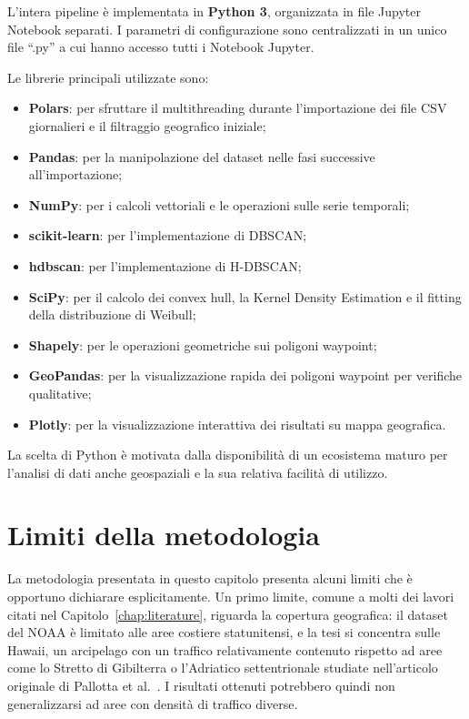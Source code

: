 L'intera pipeline è implementata in \textbf{Python 3}, organizzata in file Jupyter Notebook separati. 
I parametri di configurazione sono centralizzati in un unico file ``.py'' a cui hanno accesso tutti i Notebook Jupyter.

Le librerie principali utilizzate sono:

\begin{itemize}
    \item \textbf{Polars}: per sfruttare il multithreading durante l'importazione dei file CSV giornalieri e il filtraggio geografico iniziale;
    \item \textbf{Pandas}: per la manipolazione del dataset nelle fasi successive all'importazione;
    \item \textbf{NumPy}: per i calcoli vettoriali e le operazioni sulle serie temporali;
    \item \textbf{scikit-learn}: per l'implementazione di DBSCAN\@;
    \item \textbf{hdbscan}: per l'implementazione di H-DBSCAN;
    \item \textbf{SciPy}: per il calcolo dei convex hull, la Kernel Density Estimation e il fitting della distribuzione di Weibull;
    \item \textbf{Shapely}: per le operazioni geometriche sui poligoni waypoint;
    \item \textbf{GeoPandas}: per la visualizzazione rapida dei poligoni waypoint per verifiche qualitative;
    \item \textbf{Plotly}: per la visualizzazione interattiva dei risultati su mappa geografica.
\end{itemize}

La scelta di Python è motivata dalla disponibilità di un ecosistema maturo per l'analisi di dati anche geospaziali e la sua
relativa facilità di utilizzo.



\section{Limiti della metodologia}\label{sec:meth_limits}

La metodologia presentata in questo capitolo presenta alcuni limiti che è opportuno
dichiarare esplicitamente. Un primo limite, comune a molti dei lavori citati nel Capitolo~\ref{chap:literature}, 
riguarda la copertura geografica: il dataset
del NOAA è limitato alle aree costiere statunitensi, e la tesi si concentra sulle Hawaii,
un arcipelago con un traffico relativamente contenuto rispetto ad aree come lo Stretto di
Gibilterra o l'Adriatico settentrionale studiate nell'articolo originale di Pallotta et
al.~\cite{pallotta}. I risultati ottenuti potrebbero quindi non generalizzarsi ad aree
con densità di traffico diverse.

